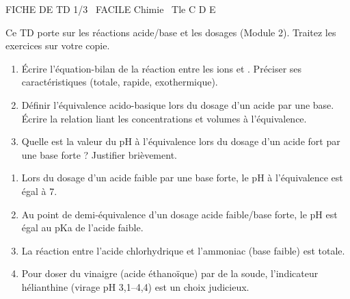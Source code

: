 \documentclass[11pt]{article}
\begin{document}
\begin{tcolorbox}[enhanced,colback=popink,colframe=popink,arc=10pt,boxrule=0pt,left=12pt,right=12pt,top=9pt,bottom=9pt]
{\color{white}\popxbold\small FICHE DE TD 1/3 \textbullet\ FACILE \hfill Chimie \textbullet\ Tle C D E\par}
\end{tcolorbox}
\vspace{4pt}
Ce TD porte sur les réactions acide/base et les dosages (Module 2). Traitez les exercices sur votre copie.

\begin{exercice}
\begin{enumerate}
    \item Écrire l'équation-bilan de la réaction entre les ions  et . Préciser ses caractéristiques (totale, rapide, exothermique).
    \item Définir l'équivalence acido-basique lors du dosage d'un acide par une base. Écrire la relation liant les concentrations et volumes à l'équivalence.
    \item Quelle est la valeur du pH à l'équivalence lors du dosage d'un acide fort par une base forte ? Justifier brièvement.
\end{enumerate}
\end{exercice}

\begin{exercice}
\begin{enumerate}
    \item Lors du dosage d'un acide faible par une base forte, le pH à l'équivalence est égal à 7.
    \item Au point de demi-équivalence d'un dosage acide faible/base forte, le pH est égal au pKa de l'acide faible.
    \item La réaction entre l'acide chlorhydrique et l'ammoniac (base faible) est totale.
    \item Pour doser du vinaigre (acide éthanoïque) par de la soude, l'indicateur hélianthine (virage pH 3,1--4,4) est un choix judicieux.
\end{enumerate}
\end{exercice}
\end{document}
